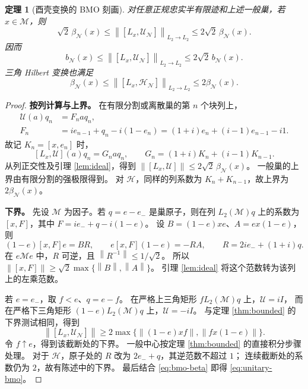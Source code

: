 \documentclass[UTF8,11pt,a4paper,fontset=fandol]{ctexart}
\newtheorem{theorem}{定理}[section]
\theoremstyle{remark}
\numberwithin{equation}{section}
\newcommand{\M}{\mathcal M}
\newcommand{\N}{\mathcal N}
\newcommand{\norm}[1]{\left\lVert #1\right\rVert}
\begin{document}
\begin{theorem}[酉壳变换的 BMO 刻画]\label{thm:unitary-bmo}
对任意正规忠实半有限迹和上述一般巢，若 $x\in\M$，则
\begin{equation}\label{eq:unitary-beta}
 \boxed{\quad
 \sqrt2\,\beta_\N(x)
 \leq\norm{[L_x,\mathcal U_\N]}_{L_2\to L_2}
 \leq2\sqrt2\,\beta_\N(x).
 \quad}
\end{equation}
因而
\begin{equation}\label{eq:unitary-bmo}
 b_\N(x)\leq\norm{[L_x,\mathcal U_\N]}_{L_2\to L_2}
       \leq2\sqrt2\,b_\N(x).
\end{equation}
三角 Hilbert 变换也满足
\[
 \beta_\N(x)\leq\norm{[L_x,\mathcal H_\N]}_{L_2\to L_2}
       \leq2\beta_\N(x).
\]
\end{theorem}

\begin{proof}
\textbf{按列计算与上界。}
在有限分割或离散巢的第 $n$ 个块列上，
\begin{align*}
 \mathcal U(a)q_n&=F_na q_n,\\
 F_n&=i e_{n-1}+q_n-i(1-e_n)
       =(1+i)e_n+(i-1)e_{n-1}-i1.
\end{align*}
故记 $K_n=[x,e_n]$ 时，
\begin{equation}\label{eq:unitary-column}
 [L_x,\mathcal U](a)q_n
 =G_na q_n,\qquad G_n=(1+i)K_n+(i-1)K_{n-1}.
\end{equation}
从列正交性及引理 \ref{lem:ideal}，得到
$\norm{[L_x,\mathcal U]}\leq2\sqrt2\,\beta_\N(x)$。
一般巢的上界由有限分割的强极限得到。
对 $\mathcal H$，同样的列系数为 $K_n+K_{n-1}$，故上界为 $2\beta_\N(x)$。

\medskip
\textbf{下界。}
先设 $\M$ 为因子。若 $q=e-e_-$ 是巢原子，则在列 $L_2(\M)q$ 上的系数为
$[x,F]$，其中 $F=i e_-+q-i(1-e)$。
设 $B=(1-e)xe$、$A=ex(1-e)$，则
\[
 (1-e)[x,F]e=BR,\qquad e[x,F](1-e)=-RA,
 \qquad R=2i e_-+(1+i)q.
\]
在 $e\M e$ 中，$R$ 可逆，且 $\norm{R^{-1}}\leq1/\sqrt2$。
所以 $\norm{[x,F]}\geq\sqrt2\max\{\norm B,\norm A\}$。
引理 \ref{lem:ideal} 将这个范数转为该列上的左乘范数。

若 $e=e_-$，取 $f<e$、$q=e-f$。
在严格上三角矩形 $fL_2(\M)q$ 上，$\mathcal U=iI$，
而在严格下三角矩形 $(1-e)L_2(\M)q$ 上，$\mathcal U=-iI$。
与定理 \ref{thm:bounded} 的下界测试相同，得到
\[
 \norm{[L_x,\mathcal U_\N]}
 \geq2\max\{\norm{(1-e)xf},\norm{fx(1-e)}\}.
\]
令 $f\uparrow e$，得到该截断处的下界。
一般中心按定理 \ref{thm:bounded} 的直接积分步骤处理。
对于 $\mathcal H$，原子处的 $R$ 改为 $2e_-+q$，其逆范数不超过 $1$；
连续截断处的系数仍为 $2$，故有陈述中的下界。
最后结合 \eqref{eq:bmo-beta} 即得 \eqref{eq:unitary-bmo}。
\end{proof}
\end{document}
